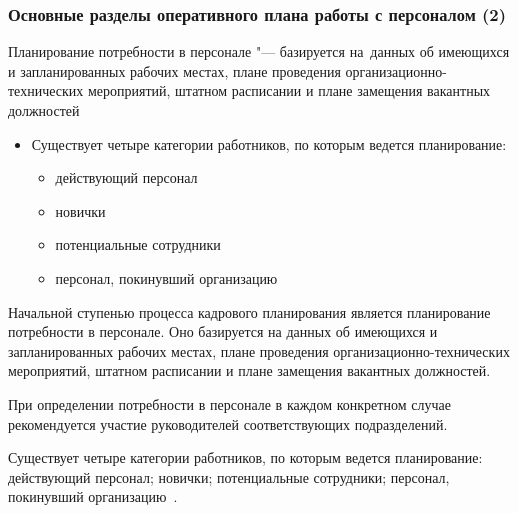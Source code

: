 \documentclass{../industrial-development}
\begin{document}
\begin{frame} \frametitle{Основные разделы оперативного плана работы с персоналом (2)}
	\alert{Планирование потребности в персонале} "--- базируется на~данных об имеющихся и запланированных рабочих местах, плане проведения организационно-технических мероприятий, штатном расписании и плане замещения вакантных должностей
	\begin{itemize}
		\item Существует четыре категории работников, по которым ведется планирование:
		\begin{itemize}
			\item	действующий персонал
			\item	новички
			\item	потенциальные сотрудники
			\item	персонал, покинувший организацию
		\end{itemize}
	\end{itemize}
\end{frame}

\lecturenotes

Начальной ступенью процесса кадрового планирования является планирование потребности в персонале. Оно базируется на данных об имеющихся и запланированных рабочих местах, плане проведения организационно-технических мероприятий, штатном расписании и плане замещения вакантных должностей.

При определении потребности в персонале в каждом конкретном случае рекомендуется участие руководителей соответствующих подразделений.

Существует четыре категории работников, по которым ведется планирование: действующий персонал; новички; потенциальные сотрудники; персонал, покинувший организацию~\cite[с.~88]{Ivanova}.
\end{document}
